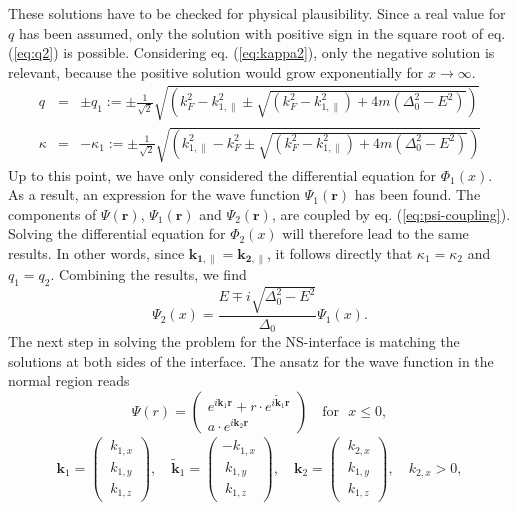 These solutions have to be checked for physical plausibility. Since a real value for $q$ has been assumed, only the solution with positive sign in the square root of eq. (\ref{eq:q2}) is possible. Considering eq. (\ref{eq:kappa2}), only the negative solution is relevant, because the positive solution would grow exponentially for $x \rightarrow \infty$.
\begin{eqnarray}
q &=& \pm q_1 := \pm \frac{1}{\sqrt{2}}\sqrt{\left( k_F^2 - k_{1, \parallel}^2 \pm \sqrt{ (k_F^2 - k_{1, \parallel}^2) + 4m(\Delta_0^2 - E^2)} \right)} \label{eq:q} \\
\kappa &=& - \kappa_1 := \pm \frac{1}{\sqrt{2}}\sqrt{\left( k_{1, \parallel}^2 - k_F^2 \pm \sqrt{ (k_F^2 - k_{1, \parallel}^2) + 4m(\Delta_0^2 - E^2)} \right)}\label{eq:kappa}
\end{eqnarray}
Up to this point, we have only considered the differential equation for $\Phi_1\left( x \right)$. As a result, an expression for the wave function $\Psi_1 \left( \mathbf{r} \right)$ has been found. The components of $\Psi \left( \mathbf{r} \right)$, $\Psi_1 \left( \mathbf{r} \right)$ and $\Psi_2 \left( \mathbf{r} \right)$, are coupled by eq. (\ref{eq:psi-coupling}). Solving the differential equation for $\Phi_2 \left( x \right)$ will therefore lead to the same results. In other words, since $\mathbf{k_{1, \parallel}} = \mathbf{k_{2, \parallel}}$, it follows directly that $\kappa_1 = \kappa_2$ and $q_1 = q_2$. 
Combining the results, we find 
\begin{equation}
\Psi_2 \left( x \right) = \frac{E \mp i \sqrt{\Delta_0^2 - E^2}}{\Delta_0} \Psi_1 \left( x \right).
\end{equation}
The next step in solving the problem for the NS-interface is matching the solutions at both sides of the interface. The ansatz for the wave function in the normal region reads
\begin{equation}
\Psi \left( r \right) = \begin{pmatrix}
e^{i \mathbf{k}_1 \mathbf{r}} + r \cdot e^{i \tilde{\mathbf{k}}_1 \mathbf{r}} \\
a \cdot e^{i \mathbf{k}_2 \mathbf{r}}
\end{pmatrix} \quad \text{for ~} x \leq 0,
\end{equation}
\begin{eqnarray}
\mathbf{k}_1  = \begin{pmatrix} ~k_{1, x} \\ ~k_{1, y}\\ ~k_{1, z} \end{pmatrix}, \quad \tilde{\mathbf{k}}_1  = \begin{pmatrix} -k_{1, x} \\ ~k_{1, y}\\ ~k_{1, z} \end{pmatrix}, \quad
\mathbf{k}_2  = \begin{pmatrix} ~k_{2, x} \\ ~k_{1, y}\\ ~k_{1, z} \end{pmatrix}, \quad k_{2, x} > 0,
\end{eqnarray}
